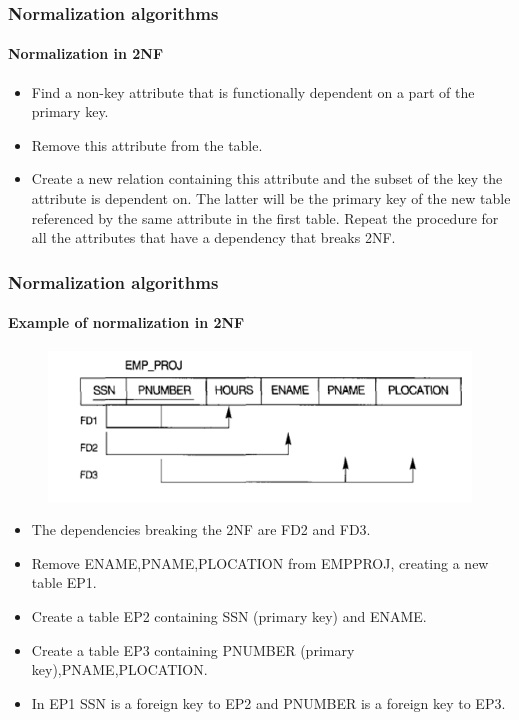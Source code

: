 \documentclass{beamer}
\begin{document}
\begin{frame}
	\frametitle{Normalization algorithms}
	\framesubtitle{Normalization in 2NF}
	
	\begin{itemize}
		\item Find a non-key attribute that is functionally dependent on a part of the primary key.
		\item Remove this attribute from the table.
		\item Create a new relation containing this attribute and the subset of the key the attribute is dependent on. The latter will be the primary key of the new table referenced by the same attribute in the first table.
		Repeat the procedure for all the attributes that have a dependency that breaks 2NF.		
	\end{itemize}
\end{frame}

\begin{frame}
	\frametitle{Normalization algorithms}
	\framesubtitle{Example of normalization in 2NF}
	
	\begin{figure}
		\includegraphics[scale=0.5]{img/normalization/norm15}
	\end{figure}
	
	\begin{itemize}
		\item The dependencies breaking the 2NF are FD2 and FD3.
		\item Remove ENAME,PNAME,PLOCATION from EMP\textunderscore PROJ, creating a new table EP1.
		\item Create a table EP2 containing SSN (primary key) and ENAME.
		\item Create a table EP3 containing PNUMBER (primary key),PNAME,PLOCATION.
		\item In EP1 SSN is a foreign key to EP2 and PNUMBER is a foreign key to EP3.		
	\end{itemize}
\end{frame}
\end{document}
